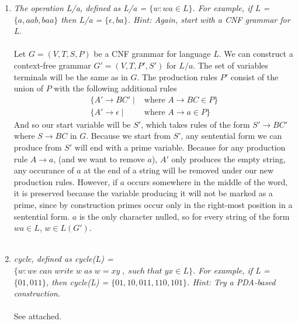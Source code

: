 \documentclass[a4paper]{article}
\begin{document}
\begin{enumerate}
\begin{enumerate}[1.]
\item \emph{The operation L/a, defined as L/a = $\{w : wa \in L\}$. For example, if L = $\{a, aab, baa\}$ then L/a = $\{\epsilon, ba\}$. Hint: Again, start with a CNF grammar for L.} \\
\\
Let $G = (V, T, S, P)$ be a CNF grammar for language $L$. We can construct a context-free grammar $G' = (V,T,P', S')$ for $L/a$. The set of variables terminals will be the same as in $G$. The production rules $P'$ consist of the union of $P$ with the following additional rules
\begin{align*}
\{A' \to BC'\; |&\text{ where }A \to BC \in P\} \\
\{A' \to \epsilon\; |&\text{ where }A \to a \in P\}
\end{align*} 
And so our start variable will be $S'$, which takes rules of the form $S'\to BC'$ where $S\to BC$ in $G$. Because we start from $S'$, any sentential form we can produce from $S'$ will end with a prime variable. Because for any production rule $A \to a$, (and we want to remove $a$), $A'$ only produces the empty string, any occurance of $a$ at the end of a string will be removed under our new production rules. However, if $a$ occurs somewhere in the middle of the word, it is preserved because the variable producing it will not be marked as a prime, since by construction primes occur only in the right-most position in a sentential form. $a$ is the only character nulled, so for every string of the form $wa \in L$, $w \in L(G')$. \\
\\



\item \emph{cycle, defined as cycle(L) = $\{w :we\;can\;write \;w \;as\; w = xy\;,\; such\; that\; yx \in L\}$. For example, if L = $\{01, 011\}$, then cycle(L) = $\{01, 10, 011, 110, 101\}$. Hint: Try a PDA-based construction.} \\
\\
See attached.


\end{enumerate}



\end{enumerate}
\end{document}
